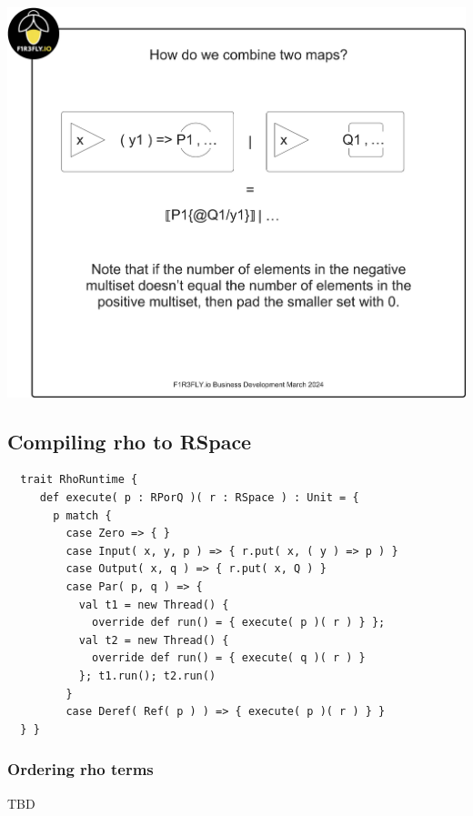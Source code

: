 \includegraphics[scale=0.25]{RHO20RSpaceSlide7.pdf}

\subsection{Compiling rho to RSpace}

\begin{lstlisting}
  trait RhoRuntime {
     def execute( p : RPorQ )( r : RSpace ) : Unit = {
       p match {
         case Zero => { }
         case Input( x, y, p ) => { r.put( x, ( y ) => p ) }
         case Output( x, q ) => { r.put( x, Q ) }
         case Par( p, q ) => {
           val t1 = new Thread() {
             override def run() = { execute( p )( r ) } };
           val t2 = new Thread() {
             override def run() = { execute( q )( r ) }
           }; t1.run(); t2.run()
         }
         case Deref( Ref( p ) ) => { execute( p )( r ) } }
  } }
\end{lstlisting}

\subsubsection{Ordering rho terms}

TBD
